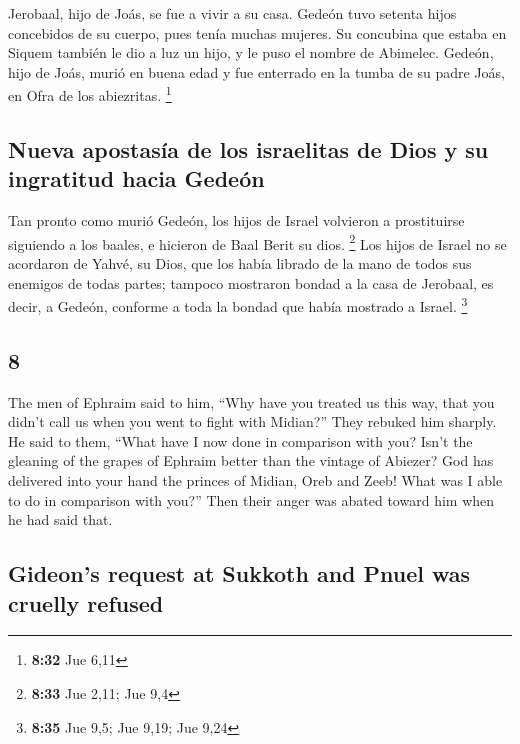 \begin{paracol}{2}
 Jerobaal, hijo de Joás, se fue a vivir a su casa.
 Gedeón tuvo setenta hijos concebidos de su cuerpo, pues
tenía muchas mujeres.  Su concubina que estaba en Siquem
también le dio a luz un hijo, y le puso el nombre de Abimelec.
 Gedeón, hijo de Joás, murió en buena edad y fue
enterrado en la tumba de su padre Joás, en Ofra de los abiezritas.
\footnote{\textbf{8:32} Jue 6,11}

\hypertarget{nueva-apostasuxeda-de-los-israelitas-de-dios-y-su-ingratitud-hacia-gedeuxf3n}{%
\subsection{Nueva apostasía de los israelitas de Dios y su ingratitud
hacia
Gedeón}\label{nueva-apostasuxeda-de-los-israelitas-de-dios-y-su-ingratitud-hacia-gedeuxf3n}}

 Tan pronto como murió Gedeón, los hijos de Israel
volvieron a prostituirse siguiendo a los baales, e hicieron de Baal
Berit su dios. \footnote{\textbf{8:33} Jue 2,11; Jue 9,4}
 Los hijos de Israel no se acordaron de Yahvé, su Dios,
que los había librado de la mano de todos sus enemigos de todas partes;
 tampoco mostraron bondad a la casa de Jerobaal, es
decir, a Gedeón, conforme a toda la bondad que había mostrado a Israel.
\footnote{\textbf{8:35} Jue 9,5; Jue 9,19; Jue 9,24}

\switchcolumn
\begin{otherlanguage}{english}

\hypertarget{section-15}{%
\section{8}\label{section-15}}

 The men of Ephraim said to him, ``Why have you treated us
this way, that you didn't call us when you went to fight with Midian?''
They rebuked him sharply.  He said to them, ``What have I
now done in comparison with you? Isn't the gleaning of the grapes of
Ephraim better than the vintage of Abiezer?  God has
delivered into your hand the princes of Midian, Oreb and Zeeb! What was
I able to do in comparison with you?'' Then their anger was abated
toward him when he had said that.

\hypertarget{gideons-request-at-sukkoth-and-pnuel-was-cruelly-refused}{%
\subsection{Gideon's request at Sukkoth and Pnuel was cruelly
refused}\label{gideons-request-at-sukkoth-and-pnuel-was-cruelly-refused}}


\end{otherlanguage}
\end{paracol}
